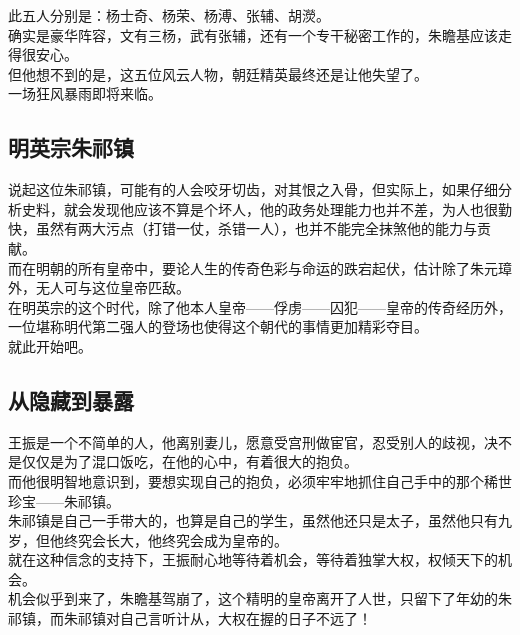 \begin{multicols}{\theparacolNo}
此五人分别是：杨士奇、杨荣、杨溥、张辅、胡濙。\\

确实是豪华阵容，文有三杨，武有张辅，还有一个专干秘密工作的，朱瞻基应该走得很安心。\\

但他想不到的是，这五位风云人物，朝廷精英最终还是让他失望了。\\

一场狂风暴雨即将来临。\\

\subsection{明英宗朱祁镇}
说起这位朱祁镇，可能有的人会咬牙切齿，对其恨之入骨，但实际上，如果仔细分析史料，就会发现他应该不算是个坏人，他的政务处理能力也并不差，为人也很勤快，虽然有两大污点（打错一仗，杀错一人），也并不能完全抹煞他的能力与贡献。\\

而在明朝的所有皇帝中，要论人生的传奇色彩与命运的跌宕起伏，估计除了朱元璋外，无人可与这位皇帝匹敌。\\

在明英宗的这个时代，除了他本人皇帝——俘虏——囚犯——皇帝的传奇经历外，一位堪称明代第二强人的登场也使得这个朝代的事情更加精彩夺目。\\

就此开始吧。\\

\subsection{从隐藏到暴露}
王振是一个不简单的人，他离别妻儿，愿意受宫刑做宦官，忍受别人的歧视，决不是仅仅是为了混口饭吃，在他的心中，有着很大的抱负。\\

而他很明智地意识到，要想实现自己的抱负，必须牢牢地抓住自己手中的那个稀世珍宝——朱祁镇。\\

朱祁镇是自己一手带大的，也算是自己的学生，虽然他还只是太子，虽然他只有九岁，但他终究会长大，他终究会成为皇帝的。\\

就在这种信念的支持下，王振耐心地等待着机会，等待着独掌大权，权倾天下的机会。\\

机会似乎到来了，朱瞻基驾崩了，这个精明的皇帝离开了人世，只留下了年幼的朱祁镇，而朱祁镇对自己言听计从，大权在握的日子不远了！\\


\end{multicols}

